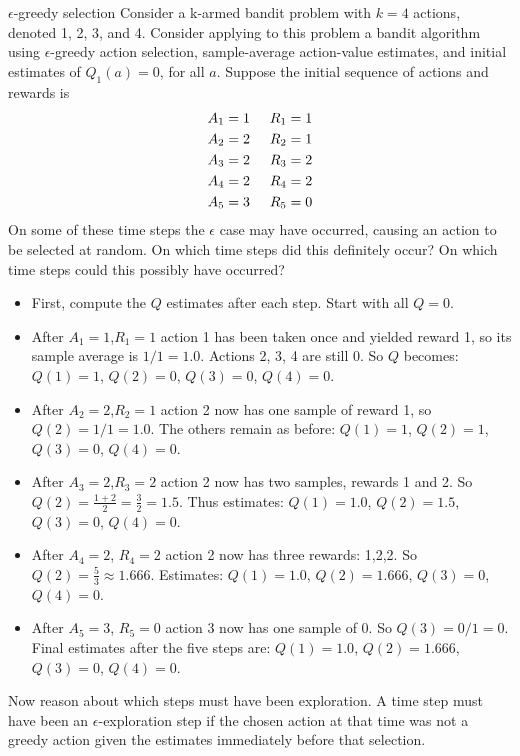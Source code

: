 \begin{Exercise}{$\epsilon$-greedy selection}{}
Consider a k-armed bandit problem with $k = 4$ actions, denoted 1, 2, 3, and 4. Consider applying to this problem a bandit algorithm using $\epsilon$-greedy action selection, sample-average action-value estimates, and initial estimates of $Q_1(a) = 0$, for all $a$.
Suppose the initial sequence of actions and rewards is
\begin{align*}
& A_1 = 1 \hspace{.5cm} R_1 = 1\\
& A_2 = 2 \hspace{.5cm} R_2 = 1\\
& A_3 = 2 \hspace{.5cm} R_3 = 2\\
& A_4 = 2 \hspace{.5cm} R_4 = 2\\
& A_5 = 3 \hspace{.5cm} R_5 = 0
\end{align*}
On some of these time steps the $\epsilon$ case may have occurred, causing an action to be selected at random. On which time steps did this definitely occur? On which time steps could this possibly have occurred?

\begin{itemize}
    \item First, compute the $Q$ estimates after each step. Start with all $Q=0$.
    \item After $A_1=1$,$R_1=1$ action 1 has been taken once and yielded reward 1, so its sample average is $1/1=1.0$. Actions 2, 3, 4 are still 0. So $Q$ becomes: $Q(1)=1$, $Q(2)=0$, $Q(3)=0$, $Q(4)=0$.
    \item After $A_2=2$,$R_2=1$ action 2 now has one sample of reward 1, so $Q(2)=1/1=1.0$. The others remain as before: $Q(1)=1$, $Q(2)=1$, $Q(3)=0$, $Q(4)=0$.
    \item After $A_3=2$,$R_3=2$ action 2 now has two samples, rewards 1 and 2. So $Q(2)=\frac{1+2}{2}=\frac{3}{2}=1.5$. Thus estimates:  $Q(1)=1.0$, $Q(2)=1.5$, $Q(3)=0$, $Q(4)=0$.
    \item After $A_4=2$, $R_4=2$ action 2 now has three rewards: 1,2,2. So $Q(2)=\frac{5}{3}\approx 1.666$. Estimates: $Q(1)=1.0$, $Q(2)=1.666$, $Q(3)=0$, $Q(4)=0$.
    \item After $A_5=3$, $R_5=0$ action 3 now has one sample of 0. So $Q(3)=0/1=0$. Final estimates after the five steps are: $Q(1)=1.0$, $Q(2)=1.666$, $Q(3)=0$, $Q(4)=0$.
\end{itemize}
Now reason about which steps must have been exploration. A time step must have been an $\epsilon$-exploration step if the chosen action at that time was not a greedy action given the estimates immediately before that selection.


\end{Exercise}
